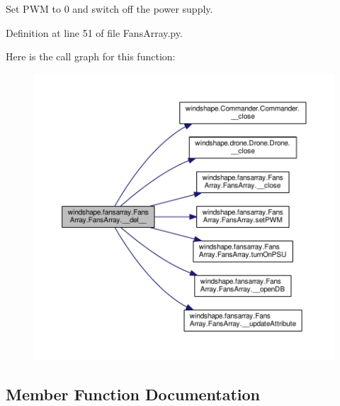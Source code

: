 \begin{DoxyVerb}Set PWM to 0 and switch off the power supply.\end{DoxyVerb}
 

Definition at line 51 of file Fans\+Array.\+py.

Here is the call graph for this function\+:\nopagebreak
\begin{figure}[H]
\begin{center}
\leavevmode
\includegraphics[width=350pt]{classwindshape_1_1fansarray_1_1_fans_array_1_1_fans_array_adde804756bae93dadb093223f56b05fa_cgraph}
\end{center}
\end{figure}


\subsection{Member Function Documentation}
\mbox{\label{classwindshape_1_1fansarray_1_1_fans_array_1_1_fans_array_aceaf476d88639804e38c4af301acfec1}} 
